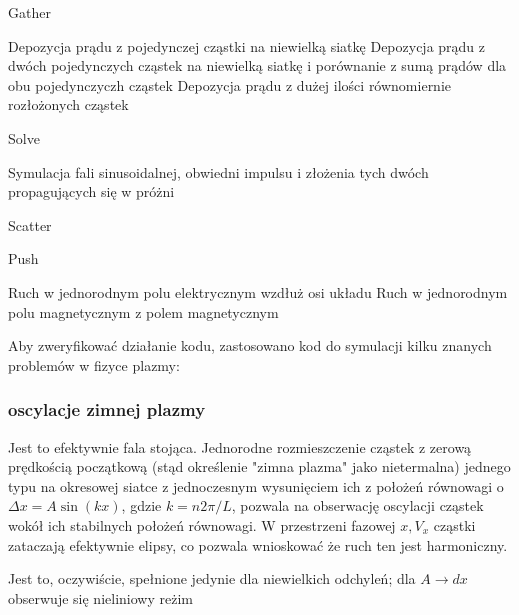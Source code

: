     \begin{enumerate}
        \itemi Gather
            \begin{enumerate}
                \itemii Depozycja prądu z pojedynczej cząstki na niewielką siatkę
                \itemii Depozycja prądu z dwóch pojedynczych cząstek na niewielką siatkę
                    i porównanie z sumą prądów dla obu pojedynczyczh cząstek
                \itemii Depozycja prądu z dużej ilości równomiernie rozłożonych cząstek
            \end{enumerate}

        \itemi Solve
            \begin{enumerate}
                \itemii Symulacja fali sinusoidalnej, obwiedni impulsu i złożenia tych dwóch
                    propagujących się w próżni
            \end{enumerate}

        \itemi Scatter
            \begin{enumerate}
                \itemii %
            \end{enumerate}

        \itemi Push
            \begin{enumerate}
                \itemii Ruch w jednorodnym polu elektrycznym wzdłuż osi układu
                \itemii Ruch w jednorodnym polu magnetycznym z polem magnetycznym
            \end{enumerate}
    \end{enumerate}

    Aby zweryfikować działanie kodu, zastosowano kod do symulacji kilku znanych problemów w fizyce plazmy:
    \subsubsection{oscylacje zimnej plazmy}
    Jest to efektywnie fala stojąca. Jednorodne rozmieszczenie cząstek z zerową prędkością początkową (stąd określenie
    "zimna plazma" jako nietermalna)
    jednego typu na okresowej siatce z jednoczesnym wysunięciem ich z położeń równowagi o $\Delta x = A \sin(kx)$,
    gdzie $k = n 2 \pi / L$, pozwala na obserwację
    oscylacji cząstek wokół ich stabilnych położeń równowagi. W przestrzeni fazowej $x, V_x$ cząstki zataczają efektywnie
    elipsy, co pozwala wnioskować że ruch ten jest harmoniczny.

    Jest to, oczywiście, spełnione jedynie dla niewielkich odchyleń; dla $A \to dx$ %
    obserwuje się nieliniowy reżim %


